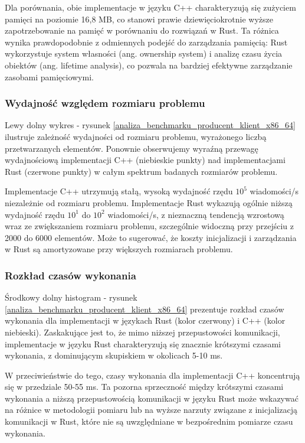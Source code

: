 Dla porównania, obie implementacje w języku C++ charakteryzują się zużyciem pamięci na poziomie 16,8 MB, co stanowi prawie dziewięciokrotnie wyższe zapotrzebowanie na pamięć w porównaniu do rozwiązań w Rust. Ta różnica wynika prawdopodobnie z odmiennych podejść do zarządzania pamięcią: Rust wykorzystuje system własności (ang. ownership system) i analizę czasu życia obiektów (ang. lifetime analysis), co pozwala na bardziej efektywne zarządzanie zasobami pamięciowymi.

\subsubsection{Wydajność względem rozmiaru problemu}
Lewy dolny wykres - rysunek \ref{analiza_benchmarku_producent_klient_x86_64} ilustruje zależność wydajności od rozmiaru problemu, wyrażonego liczbą przetwarzanych elementów. Ponownie obserwujemy wyraźną przewagę wydajnościową implementacji C++ (niebieskie punkty) nad implementacjami Rust (czerwone punkty) w całym spektrum badanych rozmiarów problemu.

Implementacje C++ utrzymują stałą, wysoką wydajność rzędu $10^5$ wiadomości/s niezależnie od rozmiaru problemu. Implementacje Rust wykazują ogólnie niższą wydajność rzędu $10^1$ do $10^2$ wiadomości/s, z nieznaczną tendencją wzrostową wraz ze zwiększaniem rozmiaru problemu, szczególnie widoczną przy przejściu z 2000 do 6000 elementów. Może to sugerować, że koszty inicjalizacji i zarządzania w Rust są amortyzowane przy większych rozmiarach problemu.



\subsubsection{Rozkład czasów wykonania}
Środkowy dolny histogram - rysunek \ref{analiza_benchmarku_producent_klient_x86_64} prezentuje rozkład czasów wykonania dla implementacji w językach Rust (kolor czerwony) i C++ (kolor niebieski). Zaskakujące jest to, że mimo niższej przepustowości komunikacji, implementacje w języku Rust charakteryzują się znacznie krótszymi czasami wykonania, z dominującym skupiskiem w okolicach 5-10 ms.

W przeciwieństwie do tego, czasy wykonania dla implementacji C++ koncentrują się w przedziale 50-55 ms. Ta pozorna sprzeczność między krótszymi czasami wykonania a niższą przepustowością komunikacji w języku Rust może wskazywać na różnice w metodologii pomiaru lub na wyższe narzuty związane z inicjalizacją komunikacji w Rust, które nie są uwzględniane w bezpośrednim pomiarze czasu wykonania.

